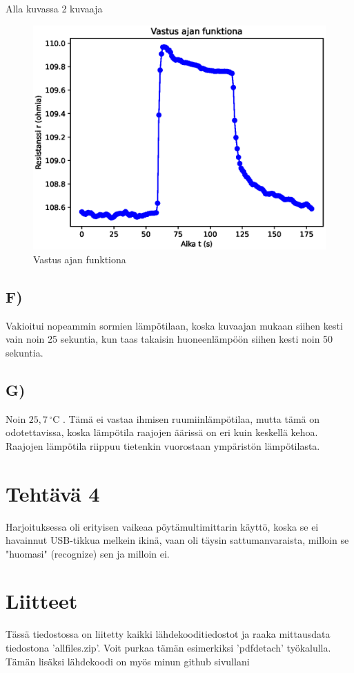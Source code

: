\documentclass{article}
\begin{document}
Alla kuvassa 2 kuvaaja

\begin{figure}[h!]
    \centering
    \includegraphics[width=1.0\linewidth]{resistance_plot.eps}
    \caption{Vastus ajan funktiona}
    \label{fig:resistance_plot_figure}
\end{figure}
\newpage
\subsection*{F)}
Vakioitui nopeammin sormien lämpötilaan, koska kuvaajan mukaan siihen kesti vain noin 25 sekuntia, kun taas takaisin huoneenlämpöön siihen kesti noin 50 sekuntia.
\subsection*{G)}
Noin $25,7\,^\circ\text{C}$ . Tämä ei vastaa ihmisen ruumiinlämpötilaa, mutta tämä on odotettavissa, koska lämpötila raajojen äärissä on eri kuin keskellä kehoa. Raajojen lämpötila riippuu tietenkin vuorostaan ympäristön lämpötilasta.

\section*{Tehtävä 4}

Harjoituksessa oli erityisen vaikeaa pöytämultimittarin käyttö, 
koska se ei havainnut USB-tikkua melkein ikinä, vaan oli täysin sattumanvaraista, 
milloin se "huomasi" (recognize) sen ja milloin ei.




\section*{Liitteet}
Tässä tiedostossa on liitetty kaikki lähdekooditiedostot ja raaka mittausdata tiedostona 'allfiles.zip'. Voit purkaa tämän esimerkiksi 'pdfdetach' työkalulla. Tämän lisäksi lähdekoodi on myös minun github sivullani \url{} 
\end{document}
